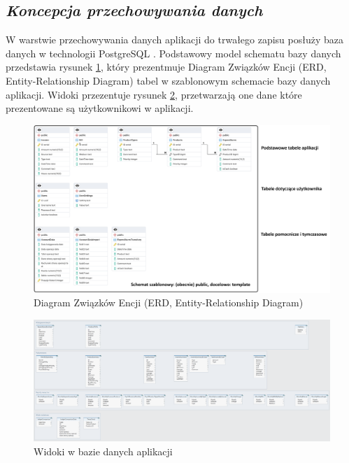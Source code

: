 \documentclass[a4paper,10pt, twoside]{report}
\newcommand{\customstylesection}[1]{\textbf{\textit{#1}}}
\begin{document}
\begin{large}
\section{\customstylesection{Koncepcja przechowywania danych}}
{W warstwie przechowywania danych aplikacji do trwałego zapisu posłuży baza 
danych w technologii PostgreSQL \cite{PostgreSQL}. Podstawowy model schematu 
bazy danych przedstawia rysunek \ref{fig:rightenerdtabele}, który prezentmuje Diagram 
Związków Encji (ERD, Entity-Relationship Diagram) tabel w szablonowym schemacie bazy 
danych aplikacji. Widoki przezentuje rysunek \ref{fig:rightenerdwidoki}, 
przetwarzają one dane które prezentowane są użytkownikowi w aplikacji.}

\begin{figure}[H]           %
    \centering
    \includegraphics[width=12cm]{figures/RightenDB_EntityRelationDiagram.png}
    \caption{Diagram Związków Encji (ERD, Entity-Relationship Diagram)}
    \label{fig:rightenerdtabele}
\end{figure}

\begin{figure}[H]           %
    \centering
    \includegraphics[width=12cm]{figures/Righten_Finances-db_Views.png}
    \caption{Widoki w bazie danych aplikacji}
    \label{fig:rightenerdwidoki}
\end{figure}


\end{large}
\end{document}
